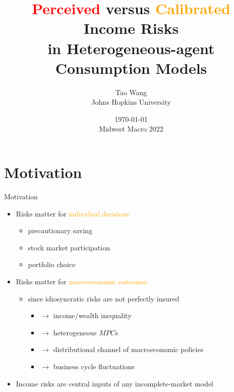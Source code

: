 \documentclass{beamer}
\title{\textcolor{red}{Perceived} versus \textcolor{orange}{Calibrated} Income Risks \\ in Heterogeneous-agent Consumption Models}
\author{Tao Wang \\ Johns Hopkins University}
\date{\today \\
	Midwest Macro 2022}
\begin{document}
	
	
\begin{frame}
	\titlepage
\end{frame}

\section{Motivation}


\begin{frame}{Motivation}
	\begin{itemize}
		\item Risks matter for \textcolor{orange}{individual decisions}
		\begin{itemize}
			\item precautionary saving 
			\item stock market participation
			\item portfolio choice 
		\end{itemize} 
		\pause 
		\item Risks matter for \textcolor{orange}{macroeconomic outcomes}
		\begin{itemize}
			\item since idiosyncratic risks are not perfectly insured 
			\begin{itemize}
				\item $\rightarrow$ income/wealth inequality 
				\item $\rightarrow$ heterogeneous $MPC$s
				\item $\rightarrow$ distributional channel of macroeconomic policies 
				\item $\rightarrow$ business cycle fluctuations
			\end{itemize}
		\end{itemize}  %
		\pause
	\item Income risks are central inputs of any incomplete-market model   

\end{itemize}
\end{frame}
\end{document}
